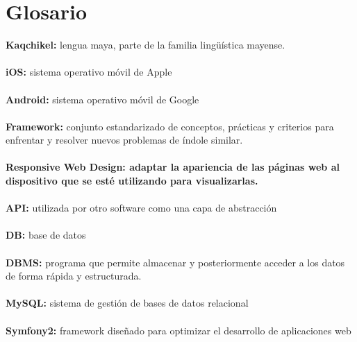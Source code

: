 \documentclass[a4paper,openright,12pt]{article}
\begin{document}
\section{Glosario}
\noindent \textbf{Kaqchikel: } lengua maya, parte de la familia lingüística mayense. \\\\
\textbf{iOS: } sistema operativo móvil de Apple \\\\
\textbf{Android: } sistema operativo móvil de Google \\\\
\textbf{Framework: } conjunto estandarizado de conceptos, prácticas y criterios para enfrentar y resolver nuevos problemas de índole similar. \\\\
\textbf{Responsive Web Design:  adaptar la apariencia de las páginas web al dispositivo que se esté utilizando para visualizarlas. }  \\\\
\textbf{API:  } utilizada por otro software como una capa de abstracción \\\\
\textbf{DB: } base de datos \\\\
\textbf{DBMS: } programa que permite almacenar y posteriormente acceder a los datos de forma rápida y estructurada.\\\\
\textbf{MySQL: }  sistema de gestión de bases de datos relacional \\\\
\textbf{Symfony2: } framework diseñado para optimizar el desarrollo de aplicaciones web\\ \\
\newpage

\pagestyle{fancy}
\end{document}
